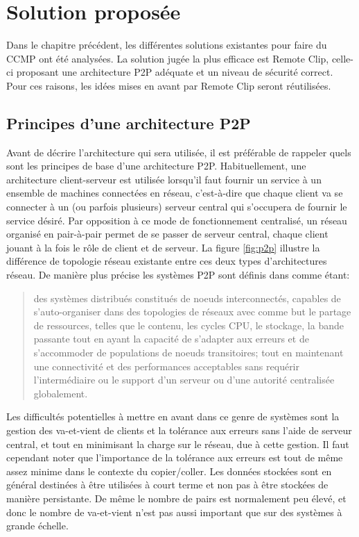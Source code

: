 \chapter{Solution proposée}
\renewcommand{\leftmark}{\thechapter.~~Solution}
Dans le chapitre précédent, les différentes solutions existantes pour faire
du CCMP ont été analysées. La solution jugée la plus efficace
est Remote Clip, celle-ci proposant une architecture P2P adéquate et un
niveau de sécurité correct. Pour ces raisons, les idées mises en avant par
Remote Clip seront réutilisées.

\section{Principes d'une architecture P2P}\label{sec:p2p}
Avant de décrire l'architecture qui sera utilisée, il est préférable
de rappeler quels sont les principes de base d'une architecture P2P.
Habituellement, une architecture client-serveur est utilisée lorsqu'il
faut fournir un service à un ensemble de machines connectées en réseau,
c'est-à-dire que chaque client va se connecter à un (ou parfois plusieurs)
serveur central qui s'occupera de fournir le service désiré. Par opposition à
ce mode de fonctionnement centralisé, un réseau organisé en pair-à-pair
permet de se passer de serveur central, chaque client jouant à la fois le rôle
de client et de serveur. La figure \ref{fig:p2p} illustre la différence
de topologie réseau existante entre ces deux types d'architectures réseau.
De manière plus précise les systèmes P2P sont définis dans \cite{AS04} comme
étant:
\begin{quote}
  des systèmes distribués constitués de noeuds interconnectés, capables de
  s'auto-organiser dans des topologies de réseaux avec comme but le partage
  de ressources, telles que le contenu, les cycles CPU, le stockage,
  la bande passante tout en ayant la capacité de s'adapter aux erreurs et
  de s'accommoder de populations de noeuds transitoires; tout en maintenant
  une connectivité et des performances acceptables sans requérir
  l'intermédiaire ou le support d'un serveur ou d'une autorité
  centralisée globalement.
\end{quote}

Les difficultés potentielles à mettre en avant dans ce genre de systèmes
sont la gestion des va-et-vient de clients et la tolérance aux erreurs
sans l'aide de serveur central, et tout en minimisant la charge sur le réseau,
due à cette gestion. Il faut cependant noter que l'importance de la tolérance
aux erreurs est tout de même assez minime dans le contexte du copier/coller.
Les données stockées sont en général destinées à être utilisées à court terme
et non pas à être stockées de manière persistante. De même le nombre de pairs
est normalement peu élevé, et donc le nombre de va-et-vient n'est pas aussi
important que sur des systèmes à grande échelle.

